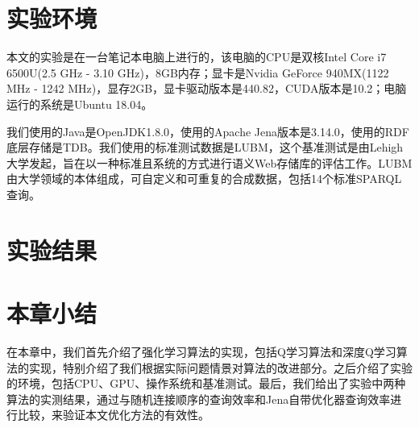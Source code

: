 \section{实验环境}
本文的实验是在一台笔记本电脑上进行的，该电脑的CPU是双核Intel Core i7 6500U(2.5 GHz - 3.10 GHz)，8GB内存；显卡是Nvidia GeForce 940MX(1122 MHz - 1242 MHz)，显存2GB，显卡驱动版本是440.82，CUDA版本是10.2；电脑运行的系统是Ubuntu 18.04。

我们使用的Java是OpenJDK1.8.0，使用的Apache Jena版本是3.14.0，使用的RDF底层存储是TDB。我们使用的标准测试数据是LUBM\cite{LUBM}，这个基准测试是由Lehigh大学发起，旨在以一种标准且系统的方式进行语义Web存储库的评估工作。LUBM由大学领域的本体组成，可自定义和可重复的合成数据，包括14个标准SPARQL查询。
\section{实验结果}
\section{本章小结}
在本章中，我们首先介绍了强化学习算法的实现，包括Q学习算法和深度Q学习算法的实现，特别介绍了我们根据实际问题情景对算法的改进部分。之后介绍了实验的环境，包括CPU、GPU、操作系统和基准测试。最后，我们给出了实验中两种算法的实测结果，通过与随机连接顺序的查询效率和Jena自带优化器查询效率进行比较，来验证本文优化方法的有效性。
